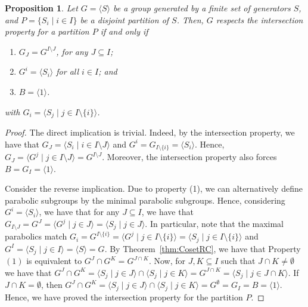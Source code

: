 \documentclass[11pt,letterpaper]{amsart}
\newtheorem{proposition}[theorem]{Proposition}
\begin{document}
\begin{proposition}\label{prop:General_IP_equiv_RC_B=1}
    Let $G=\langle S\rangle $ be a group generated by a finite set of generators $S$, and $P=\{S_i\mid i\in I\}$ be a disjoint partition of $S$.
    Then, $G$ respects the intersection property for a partition $P$ if and only if \begin{enumerate}
        \item $G_J = G^{I\setminus J}$, for any $J\subseteq I$;
        \item $G^i=\langle S_i\rangle$ for all $i\in I$; and 
        \item $B = \langle 1\rangle$.
    \end{enumerate}
    with $G_{i}=\langle S_j\mid j\in I\setminus\{i\}\rangle$.
\end{proposition}
\begin{proof}
    The direct implication is trivial. Indeed, by the intersection property, we have that $G_J = \langle S_i \mid i\in I\setminus J\rangle$ and $G^i = G_{I\setminus\{i\}}= \langle S_i\rangle$. Hence, $G_J = \langle G^j \mid j\in I\setminus J\rangle = G^{I\setminus J}$. Moreover, the intersection property also forces $B = G_I=\langle 1\rangle$.

    Consider the reverse implication.
    Due to property (1), we can alternatively define parabolic subgroups by the minimal parabolic subgroups. Hence, considering $G^i = \langle S_i\rangle$, we have that for any $J\subseteq I$, we have that $G_{I\setminus J}= G^J = \langle G^j \mid j\in J\rangle = \langle S_j\mid j \in J\rangle$. In particular, note that the maximal parabolics match $G_i = G^{I\setminus\{i\}} = \langle G^j \mid j\in I\setminus\{i\}\rangle =\langle S_j\mid j\in I\setminus\{i\}\rangle$ 
    and 
    $G^I = \langle S_j\mid j\in I\rangle = \langle S\rangle = G$.
    By Theorem~\ref{thm:CosetRC}, we have that Property $(1)$ is equivalent to $G^J \cap G^K = G^{J\cap K}$.
    Now, for $J,K\subseteq I$ such that $J\cap K\neq \emptyset$ we have that 
    $G^J \cap G^K = \langle S_j \mid j \in J\rangle \cap \langle S_j\mid j \in K\rangle = G^{J\cap K}= \langle S_j\mid j\in J\cap K\rangle$.
    If $J\cap K=\emptyset$, then $G^J \cap G^K = \langle S_j \mid j \in J\rangle \cap \langle S_j\mid j \in K\rangle = G^{\emptyset} = G_I = B= \langle 1\rangle$. Hence, we have proved the intersection property for the partition $P$. 
    
\end{proof}
\end{document}
